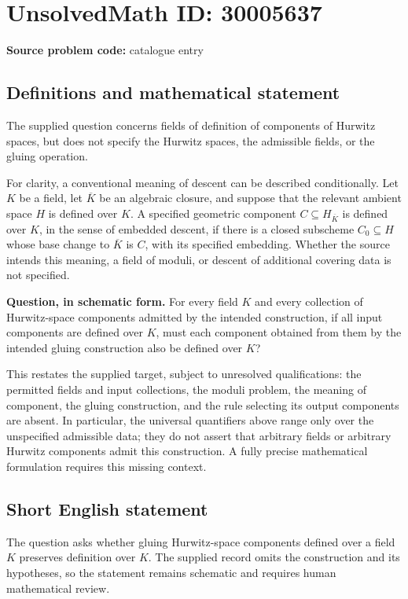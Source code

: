 \documentclass[11pt]{article}
\begin{document}
\section*{UnsolvedMath ID: 30005637}
\textbf{Source problem code:} catalogue entry
\subsection{Definitions and mathematical statement}
The supplied question concerns fields of definition of components of Hurwitz spaces, but does not specify the Hurwitz spaces, the admissible fields, or the gluing operation.

For clarity, a conventional meaning of descent can be described conditionally. Let \(K\) be a field, let \(\overline K\) be an algebraic closure, and suppose that the relevant ambient space \(H\) is defined over \(K\). A specified geometric component \(C\subseteq H_{\overline K}\) is defined over \(K\), in the sense of embedded descent, if there is a closed subscheme \(C_0\subseteq H\) whose base change to \(\overline K\) is \(C\), with its specified embedding. Whether the source intends this meaning, a field of moduli, or descent of additional covering data is not specified.

\textbf{Question, in schematic form.} For every field \(K\) and every collection of Hurwitz-space components admitted by the intended construction, if all input components are defined over \(K\), must each component obtained from them by the intended gluing construction also be defined over \(K\)?

This restates the supplied target, subject to unresolved qualifications: the permitted fields and input collections, the moduli problem, the meaning of component, the gluing construction, and the rule selecting its output components are absent. In particular, the universal quantifiers above range only over the unspecified admissible data; they do not assert that arbitrary fields or arbitrary Hurwitz components admit this construction. A fully precise mathematical formulation requires this missing context.
\subsection{Short English statement}
The question asks whether gluing Hurwitz-space components defined over a field \(K\) preserves definition over \(K\). The supplied record omits the construction and its hypotheses, so the statement remains schematic and requires human mathematical review.
\end{document}
